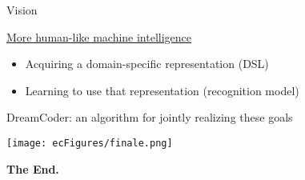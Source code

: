 \documentclass{beamer}
\begin{document}
\begin{comment}
\begin{frame}{Tower building in blocks world}
  \large
\centering  
  Control a hand that puts down blocks \\
  \hspace{1cm}(turtle: control a pen that puts down ink)
\only<1>{\texttt{[image: ecFigures/3t.png]}}
\only<2>{\texttt{[image: ecFigures/every\_tower.png]}}
  

  \end{frame}

\begin{frame}{Tower building in blocks world: Learned concepts}
  Parametric planning primitives. Example pyramid concept:

  \texttt{[image: ecFigures/pyramid.png]}

\end{frame}

\begin{frame}{Tower building in blocks world: Learned concepts}
  Parametric planning primitives. Example brickwall concept:

  \texttt{[image: ecFigures/brickwall.png]} 

\end{frame}
  \end{comment}


\begin{frame}{Vision}


   \underline{More human-like machine intelligence}\\%
   \begin{itemize}
   \item    Acquiring a domain-specific representation (DSL)
     \item Learning  to use that representation (recognition model)
   \end{itemize}
   DreamCoder: an algorithm for jointly realizing these goals

   



   \hspace{-1cm}\texttt{[image: ecFigures/finale.png]}

   \pause

   \Huge \centering \textbf{The End.}
  \end{frame}
\end{document}
